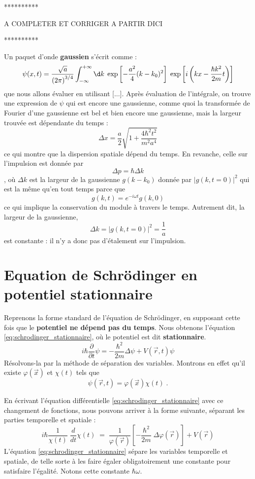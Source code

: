 \documentclass{book}
\begin{document}
**********

A COMPLETER ET CORRIGER A PARTIR DICI

**********

Un paquet d'onde \textbf{gaussien} s'écrit comme :
\begin{equation}
\psi(x, t) = \dfrac{\sqrt{a}}{\left(2\pi\right) ^{3/4}} \int_{-\infty} ^{+\infty} \d k \; \exp \left[-\dfrac{a^2}{4} (k-k_0)^2\right] \; \exp\left[i \left(kx - \dfrac{\hbar k^2}{2m}t\right)\right]
\end{equation}
que nous allons évaluer en utilisant [...]. Après évaluation de l'intégrale, on trouve une expression de $\psi$ qui est encore une gaussienne, comme quoi la transformée de Fourier d'une gaussienne est bel et bien encore une gaussienne, mais la largeur trouvée est dépendante du temps :
\begin{equation}
\Delta x = \dfrac{a}{2} \sqrt{ 1 + \dfrac{4 \hbar ^2 t^2}{m^2 a^4}}
\end{equation}
ce qui montre que la dispersion spatiale dépend du temps. En revanche, celle sur l'impulsion est donnée par $$\Delta p = \hbar \Delta k$$, où $\Delta k$ est la largeur de la gaussienne $g(k-k_0)$ donnée par $|g(k,t=0)|^2$ qui est la même qu'en tout temps parce que $$g(k,t) = e^{-i\omega t} g(k,0)$$ ce qui implique la conservation du module à travers le temps. Autrement dit, la largeur de la gaussienne, 
$$\Delta k = |g(k,t=0)|^2 = \dfrac{1}{a}$$
est constante : il n'y a donc pas d'étalement sur l'impulsion.



\section{Equation de Schrödinger en potentiel stationnaire}
Reprenons la forme standard de l'équation de Schrödinger, en supposant cette fois que le \textbf{potentiel ne dépend pas du temps}. Nous obtenons l'équation \eqref{eq:schrodinger_stationnaire}, où le potentiel est dit \textbf{stationnaire}. 
\begin{equation} \label{eq:schrodinger_stationnaire}
i\hbar \dfrac{\partial}{\partial t} \psi = -\dfrac{\hbar ^2}{2m} \Delta \psi + V(\vec r, t) \psi
\end{equation}
Résolvons-la par la méthode de séparation des variables. Montrons en effet qu'il existe $\varphi(\vec x)$ et $\chi(t)$ tels que $$\psi(\vec r, t) = \varphi(\vec x) \chi(t)\; .$$

En écrivant l'équation différentielle \eqref{eq:schrodinger_stationnaire} avec ce changement de fonctions, nous pouvons arriver à la forme suivante, séparant les parties temporelle et spatiale :
\begin{equation}
i\hbar \dfrac{1}{\chi(t)} \; \dfrac{d}{dt} \chi(t) \; = \; \dfrac{1}{\varphi(\vec r)} \left[ -\dfrac{\hbar ^2}{2m} \; \Delta \varphi(\vec r) \right] + V(\vec r)
\end{equation}
L'équation \eqref{eq:schrodinger_stationnaire} sépare les variables temporelle et spatiale, de telle sorte à les faire égaler obligatoirement une constante pour satisfaire l'égalité. Notons cette constante $\hbar \omega$. 
\end{document}

